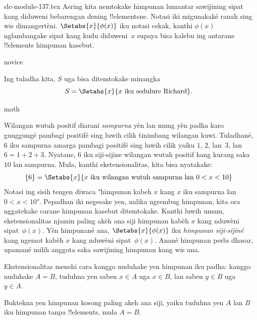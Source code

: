 \begin{filecontents*}[overwrite]{slc-module-137.tex}
Asring kita nemtokake himpunan lumantar sawijining sipat kang
diduweni bebarengan dening !!{element}sne. Notasi iki migunakaké ranah sing wis dimangertèni. $\Setabs{x}{\phi(x)}$ iku notasi cekak, kanthi $\phi(x)$
nglambangake sipat kang kudu diduweni~$x$ supaya bisa kalebu
ing antarane !!{element}s himpunan kasebut.

\begin{tagblock}{novice}
\begin{ex}
Ing tuladha kita, $S$ uga bisa ditemtokake minangka
\[
S = \Setabs{x}{x \text{ iku sedulure Richard}}.
\]
\end{ex}
\end{tagblock}

\begin{tagblock}{math}
\begin{ex}
Wilangan wutuh positif diarani \emph{sampurna} yèn lan mung yèn padha karo
gunggungé pambagi positifé sing luwih cilik tinimbang wilangan kuwi.
Tuladhané, $6$ iku sampurna amarga pambagi positifé sing luwih cilik
yaiku $1$, $2$, lan~$3$, lan
$6 = 1 + 2 + 3$. Nyatane, $6$ iku siji-sijine wilangan wutuh
positif kang kurang saka $10$ lan sampurna. Mula, kanthi
ekstensionalitas, kita bisa nyatakake:
\[
	\{6\} = \Setabs{x}{x\text{ iku wilangan wutuh sampurna lan }0 < x < 10}
\]
Notasi ing sisih tengen diwaca "himpunan kabeh $x$ kang $x$ iku
sampurna lan $0 < x < 10$". Pepadhan iki negesake yen,
nalika ngrembug himpunan, kita ora nggatekake carane himpunan kasebut
ditemtokake. Kanthi luwih umum, ekstensionalitas njamin paling akèh ana
siji himpunan kabèh $x$ kang nduwèni sipat~$\phi(x)$.
Yèn himpunané ana, $\Setabs{x}{\phi(x)}$ iku \emph{himpunan siji-sijiné} kang
ngemot kabèh $x$ kang nduwèni sipat~$\phi(x)$.
Anané himpunan perlu dhasar, upamané milih anggota saka sawijining
himpunan kang wis ana.
\end{ex}
\end{tagblock}

Ekstensionalitas menehi cara kanggo nuduhake yen himpunan iku padha:
kanggo nuduhake $A = B$, tuduhna yen saben $x \in A$ uga $x \in B$,
lan saben $y \in B$ uga $y \in A$.

\begin{prob}
Buktekna yen himpunan kosong paling akeh ana siji, yaiku tuduhna
yen $A$ lan $B$ iku himpunan tanpa !!{element}s, mula $A = B$.
\end{prob}


\end{filecontents*}

